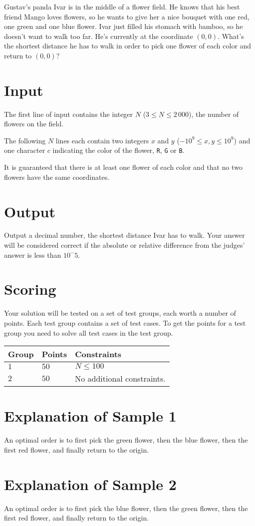 \noindent

Gustav's panda Ivar is in the middle of a flower field.
He knows that his best friend Mango loves flowers, so he wants to give her a nice bouquet with one red, one green and one blue flower.
Ivar just filled his stomach with bamboo, so he doesn't want to walk too far.
He's currently at the coordinate $(0,0)$. What's the shortest distance he has to walk in order to pick one flower of each color and return to $(0,0)$?

\section*{Input}
The first line of input contains the integer $N$ ($3 \leq N \leq 2\,000$), the number of flowers on the field.

The following $N$ lines each contain two integers $x$ and $y$ ($-10^9 \leq x,y \leq 10^9$) and one character $c$ indicating the color
of the flower, \texttt{R}, \texttt{G} or \texttt{B}.

It is guaranteed that there is at least one flower of each color and that no two flowers have the same coordinates.

\section*{Output}
Output a decimal number, the shortest distance Ivar has to walk.
Your answer will be considered correct if the absolute or relative difference from the judges' answer is less than $10^-5$.

\section*{Scoring}
Your solution will be tested on a set of test groups, each worth a number of points. Each test group contains
a set of test cases. To get the points for a test group you need to solve all test cases in the test group.

\noindent
\begin{tabular}{| l | l | p{12cm} |}
  \hline
  \textbf{Group} & \textbf{Points} & \textbf{Constraints} \\ \hline
  $1$    & $50$       & $N \leq 100$ \\ \hline
  $2$    & $50$       & No additional constraints. \\ \hline
\end{tabular}

\section*{Explanation of Sample 1}
An optimal order is to first pick the green flower, then the blue flower, then the first red flower, and finally return to the origin.

\section*{Explanation of Sample 2}
An optimal order is to first pick the blue flower, then the green flower, then the first red flower, and finally return to the origin.
